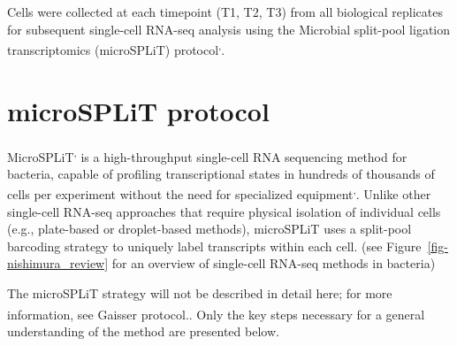 \documentclass[
  11pt,
  a4paper,
]{report}
\begin{document}
Cells were collected at each timepoint (T1, T2, T3) from all biological
replicates for subsequent single-cell RNA-seq analysis using the
Microbial split-pool ligation transcriptomics (microSPLiT)
protocol\textsuperscript{,}.

\section{microSPLiT protocol}\label{microsplit-protocol}

MicroSPLiT\textsuperscript{,}
is a high-throughput single-cell RNA sequencing method for bacteria,
capable of profiling transcriptional states in hundreds of thousands of
cells per experiment without the need for specialized
equipment\textsuperscript{,}.
Unlike other single-cell RNA-seq approaches that require physical
isolation of individual cells (e.g., plate-based or droplet-based
methods), microSPLiT uses a split-pool barcoding strategy to uniquely
label transcripts within each cell. (see
Figure~\ref{fig-nishimura_review} for an overview of single-cell RNA-seq
methods in bacteria)

\begin{tcolorbox}[enhanced jigsaw, colbacktitle=quarto-callout-tip-color!10!white, bottomtitle=1mm, coltitle=black, colframe=quarto-callout-tip-color-frame, left=2mm, bottomrule=.15mm, rightrule=.15mm, opacityback=0, toptitle=1mm, colback=white, title=\textcolor{quarto-callout-tip-color}{\faLightbulb}\hspace{0.5em}{Information}, arc=.35mm, toprule=.15mm, breakable, leftrule=.75mm, opacitybacktitle=0.6, titlerule=0mm]

The microSPLiT strategy will not be described in detail here; for more
information, see Gaisser
protocol.\textsuperscript{}. Only the key
steps necessary for a general understanding of the method are presented
below.

\end{tcolorbox}
\end{document}
